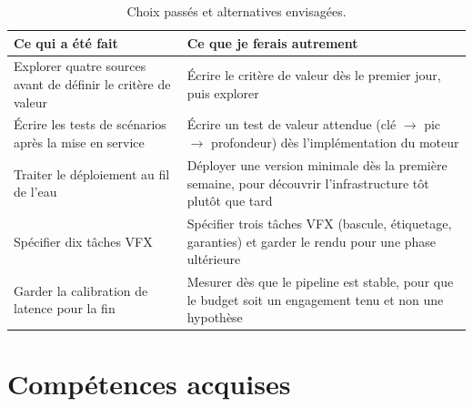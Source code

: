 \begin{table}[H]
\centering
\small
\caption{Choix passés et alternatives envisagées.}
\label{tab:retro}
\begin{tabularx}{\textwidth}{@{}X X@{}}
\toprule
\textbf{Ce qui a été fait} & \textbf{Ce que je ferais autrement} \\
\midrule
Explorer quatre sources avant de définir le critère de valeur &
  Écrire le critère de valeur dès le premier jour, puis explorer \\
\addlinespace
Écrire les tests de scénarios après la mise en service &
  Écrire un test de valeur attendue (clé $\rightarrow$ pic $\rightarrow$
  profondeur) dès l'implémentation du moteur \\
\addlinespace
Traiter le déploiement au fil de l'eau &
  Déployer une version minimale dès la première semaine, pour découvrir
  l'infrastructure tôt plutôt que tard \\
\addlinespace
Spécifier dix tâches VFX &
  Spécifier trois tâches VFX (bascule, étiquetage, garanties) et garder le
  rendu pour une phase ultérieure \\
\addlinespace
Garder la calibration de latence pour la fin &
  Mesurer dès que le pipeline est stable, pour que le budget soit un
  engagement tenu et non une hypothèse \\
\bottomrule
\end{tabularx}
\end{table}

\section{Compétences acquises}


